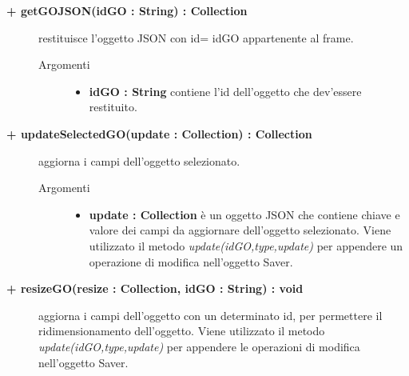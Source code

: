 \begin{description}
\begin{description}
\begin{description}
\begin{description}
\end{description}

\end{description}


\begin{description}
		\item[\textbf{\color{blue}+ getGOJSON(idGO : String) : Collection			}] \hfill
			restituisce l'oggetto JSON con id= idGO appartenente al frame.   

\begin{description}
			\item[Argomenti] \hfill
				\begin{itemize}
						\item \textbf{idGO : String			} \hfill
					contiene l'id dell'oggetto che dev'essere restituito.
				\end{itemize}

\end{description}

\end{description}

\begin{description}
		\item[\textbf{\color{blue}+ updateSelectedGO(update : Collection) : Collection			}] \hfill
			aggiorna i campi dell'oggetto selezionato.   

\begin{description}
			\item[Argomenti] \hfill
				\begin{itemize}
						\item \textbf{update : Collection			} \hfill
					è un oggetto JSON che contiene chiave e valore dei campi da aggiornare dell'oggetto selezionato. Viene utilizzato il metodo \textit{update(idGO,type,update)} per appendere un operazione di modifica nell'oggetto Saver.
				\end{itemize}

\end{description}

\end{description}

\begin{description}
		\item[\textbf{\color{blue}+ resizeGO(resize : Collection, idGO : String) : void			}] \hfill
			aggiorna i campi dell'oggetto con un determinato id, per permettere il ridimensionamento dell'oggetto. Viene utilizzato il metodo \textit{update(idGO,type,update)} per appendere le operazioni di modifica nell'oggetto Saver.    


\end{description}
\end{description}
\end{description}
